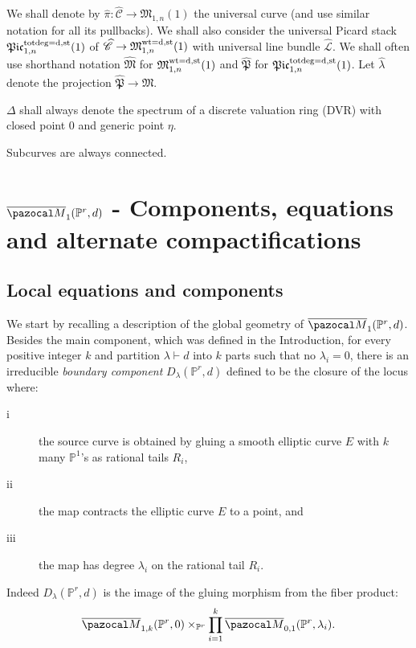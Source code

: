 \documentclass[11pt]{amsart}
\newcommand{\M}[4]{\overline{\pazocal M}_{#1,#2}(#3,#4)}
\newcommand{\PP}{\mathbb P}
\renewcommand{\to}{\rightarrow}
\newcommand{\cC}{\mathcal C}
\newcommand{\MM}{\mathfrak M}
\newcommand{\oM}{\overline{\pazocal M}}
\newcommand{\PtoM}{\lambda}
\newcommand{\dvr}{\Delta}
\theoremstyle{plain}
\theoremstyle{definition}
\begin{document}
We shall denote by $\hat{\pi}\colon \widehat{\cC}\to \MM_{1,n}(1)$ the universal curve (and use similar notation for all its pullbacks). We shall also consider the universal Picard stack $\mathfrak{Pic}^{\rm{tot deg}=d,\rm{st}}_{1,n}(1)$ of $\widehat{\cC}\to \mathfrak M_{1,n}^{\rm{wt}=d,\rm{st}}(1)$ with universal line bundle $\widehat{\mathcal{L}}$. We shall often use shorthand notation $\widehat{\MM}$ for $\mathfrak M_{1,n}^{\rm{wt}=d,\rm{st}}(1)$ and $\widehat{\mathfrak P}$ for $\mathfrak{Pic}^{\rm{tot deg}=d,\rm{st}}_{1,n}(1)$. Let $\hat{\PtoM}$ denote the projection $\widehat{\mathfrak P}\to \widehat{\MM}$.


$\dvr$ shall always denote the spectrum of a discrete valuation ring (DVR) with closed point $0$ and generic point $\eta$.

Subcurves are always connected.






\section{$\oM_1(\PP^r,d)$ - Components, equations  and alternate compactifications}\label{sec:section1}

\subsection{Local equations and components}
We start by recalling a description of the global geometry of $\oM_1(\PP^r,d)$. Besides the main component, which was defined in the Introduction, for every positive integer $k$ and partition $\lambda\vdash d$ into $k$ parts such that no $\lambda_i=0$, there is an irreducible \emph{boundary component} $D_{\lambda}(\PP^r,d)$ defined to be the closure of the locus where:
\begin{description}
\item[i] the source curve is obtained by gluing a smooth elliptic curve $E$ with $k$ many $\PP^1$'s as rational tails $R_i$,
\item[ii] the map contracts the elliptic curve $E$ to a point, and
\item[iii] the map has degree $\lambda_i$ on the rational tail $R_i$.
\end{description}
Indeed $D_{\lambda}(\PP^r,d)$ is the image of the gluing morphism from the fiber product:
$$\M{1}{k}{\PP^r}{0}\times_{\PP^r}\prod_{i=1}^k\M{0}{1}{\PP^r}{\lambda_i}.$$
\end{document}
